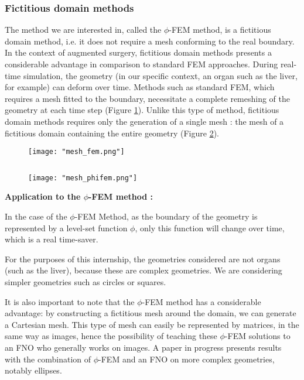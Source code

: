 \subsubsection{Fictitious domain methods} \label{FEMs.PhiFEM.pinciple}

The method we are interested in, called the $\phi$-FEM method, is a fictitious domain method, i.e. it does not require a mesh conforming to the real boundary. In the context of augmented surgery, fictitious domain methods presents a considerable advantage in comparison to standard FEM approaches. During real-time simulation, the geometry (in our specific context, an organ such as the liver, for example) can deform over time. Methods such as standard FEM, which requires a mesh fitted to the boundary, necessitate a complete remeshing of the geometry at each time step (Figure \ref{mesh_fem}). Unlike this type of method, fictitious domain methods requires only the generation of a single mesh : the mesh of a fictitious domain containing the entire geometry (Figure \ref{mesh_phifem}). 

\begin{minipage}{0.52\linewidth}
	\begin{figure}[H]
		\centering
		\texttt{[image: "mesh\_fem.png"]}
		\label{mesh_fem}
	\end{figure}
\end{minipage} $\qquad$
\begin{minipage}{0.44\linewidth}
	\begin{figure}[H]
		\centering
		\texttt{[image: "mesh\_phifem.png"]}
		\label{mesh_phifem}
	\end{figure}
\end{minipage}

\textbf{Application to the $\phi$-FEM method :}

In the case of the $\phi$-FEM Method, as the boundary of the geometry is represented by a level-set function $\phi$, only this function will change over time, which is a real time-saver.

For the purposes of this internship, the geometries considered are not organs (such as the liver), because these are complex geometries. We are considering simpler geometries such as circles or squares. 

It is also important to note that the $\phi$-FEM method has a considerable advantage: by constructing a fictitious mesh around the domain, we can generate a Cartesian mesh. This type of mesh can easily be represented by matrices, in the same way as images, hence the possibility of teaching these $\phi$-FEM solutions to an FNO who generally works on images. A paper in progress presents results with the combination of $\phi$-FEM and an FNO on more complex geometries, notably ellipses.

